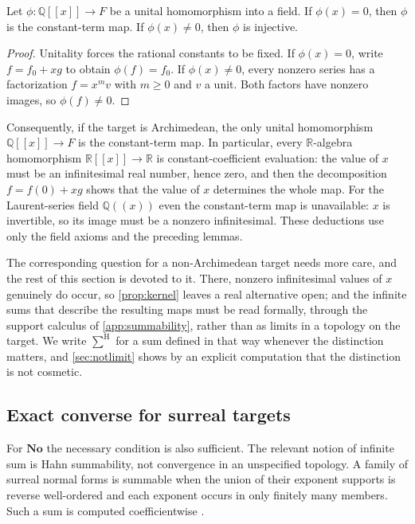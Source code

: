 \documentclass[11pt,letterpaper]{article}
\theoremstyle{definition}
\theoremstyle{remark}
\newenvironment{proposition}{\crefalias{theorem}{proposition}\propositionx}{\endpropositionx}
\newcommand{\No}{\mathbf{No}}
\newcommand{\R}{\mathbb R}
\newcommand{\Q}{\mathbb Q}
\newcommand{\seqsum}{\mathop{\sum}\nolimits^{\mathrm H}}
\begin{document}
\begin{proposition}[The kernel dichotomy]\label{prop:kernel}
Let $\phi:\Q[[x]]\to F$ be a unital homomorphism into a field. If
$\phi(x)=0$, then $\phi$ is the constant-term map. If $\phi(x)\ne0$,
then $\phi$ is injective.
\end{proposition}
\begin{proof}
Unitality forces the rational constants to be fixed. If $\phi(x)=0$, write
$f=f_0+xg$ to obtain $\phi(f)=f_0$. If $\phi(x)\ne0$, every nonzero series
has a factorization $f=x^m v$ with $m\ge0$ and $v$ a unit. Both factors
have nonzero images, so $\phi(f)\ne0$.
\end{proof}

Consequently, if the target is Archimedean, the only unital homomorphism
$\Q[[x]]\to F$ is the constant-term map. In particular, every $\R$-algebra
homomorphism $\R[[x]]\to\R$ is constant-coefficient evaluation: the value of
$x$ must be an infinitesimal real number, hence zero, and then the
decomposition $f=f(0)+xg$ shows that the value of $x$ determines the whole
map. For the Laurent-series field $\Q((x))$ even the constant-term map is
unavailable: $x$ is invertible, so its image must be a nonzero infinitesimal.
These deductions use only the field axioms and the preceding lemmas.

The corresponding question for a non-Archimedean target needs more care, and
the rest of this section is devoted to it. There, nonzero infinitesimal values
of $x$ genuinely do occur, so \cref{prop:kernel} leaves a real alternative
open; and the infinite sums that describe the resulting maps must be read
formally, through the support calculus of \cref{app:summability}, rather than
as limits in a topology on the target. We write $\seqsum$ for a sum defined in
that way whenever the distinction matters, and \cref{sec:notlimit} shows by an
explicit computation that the distinction is not cosmetic.

\subsection{Exact converse for surreal targets}
For $\No$ the necessary condition is also sufficient. The relevant notion
of infinite sum is Hahn summability, not convergence in an unspecified topology.
A family of surreal normal forms is summable when the union of their exponent
supports is reverse well-ordered and each exponent occurs in only finitely
many members. Such a sum is computed coefficientwise
\citep[Definition 2.9]{BerarducciMantova2018}.
\end{document}

